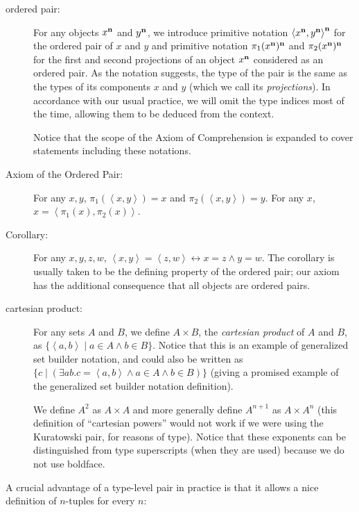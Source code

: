 \documentclass[12pt]{book}
\begin{document}
\begin{description}

\item[ordered pair:] For any objects $x^{\bf n}$ and $y^{\bf n}$, we
introduce primitive notation $\left<x^{\bf n},y^{\bf n}\right>^{\bf
n}$ for the ordered pair of $x$ and $y$ and primitive notation
$\pi_1(x^{\bf n})^{\bf n}$ and $\pi_2(x^{\bf n})^{\bf n}$ for the
first and second projections of an object $x^{\bf n}$ considered as an
ordered pair.  As the notation suggests, the type of the pair is the
same as the types of its components $x$ and $y$ (which we call its
{\em projections\/}).  In accordance with our usual practice, we will
omit the type indices most of the time, allowing them to be deduced
from the context.

Notice that the scope of the Axiom of Comprehension is expanded to cover
statements including these notations.

\item[Axiom of the Ordered Pair:]
For any $x,y$, $\pi_1(\left<x,y\right>)=x$ and $\pi_2(\left<x,y\right>)=y$.
 For any $x$,
$x=\left<\pi_1(x),\pi_2(x)\right>$.

\item[Corollary:] For any $x,y,z,w$,
$\left<x,y\right>=\left<z,w\right>\leftrightarrow x=z\wedge y=w$.  The
corollary is usually taken to be the defining property of the ordered
pair; our axiom has the additional consequence that all objects are
ordered pairs.

\item[cartesian product:] For any sets $A$ and $B$, we define $A
\times B$, the {\em cartesian product\/} of $A$ and $B$, as
$\{\left<a,b\right> \mid a \in A \wedge b \in B\}$.  Notice that this
is an example of generalized set builder notation, and could also be
written as $\{c \mid (\exists ab.c = \left<a,b\right> \wedge a \in A
\wedge b \in B)\}$ (giving a promised example of the
generalized set builder notation definition).

We define $A^2$ as $A \times A$ and more generally define $A^{n+1}$ as
$A \times A^n$ (this definition of ``cartesian powers'' would not work
if we were using the Kuratowski pair, for reasons of type).  Notice
that these exponents can be distinguished from type superscripts (when they are
used) because we do not use boldface.

\end{description}

A crucial advantage of a type-level pair in practice is that it allows a nice definition of $n$-tuples for every $n$:
\end{document}

